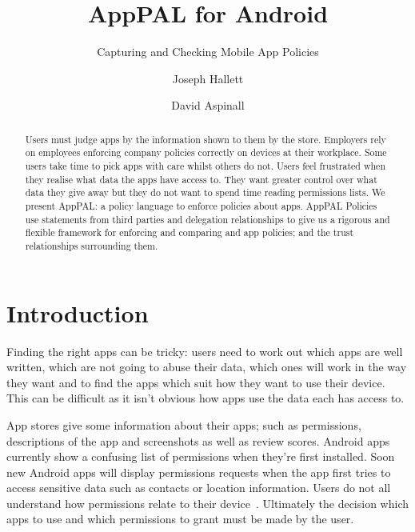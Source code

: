 \documentclass[]{scrartcl}
\title{AppPAL for Android}
\subtitle{Capturing and Checking Mobile App Policies}
\author{Joseph Hallett \and David Aspinall }
\newcommand{\comment}[1]{}%
\begin{document}
\maketitle{}

\begin{abstract}
  Users must judge apps by the information shown to them by the store.
  Employers rely on employees enforcing company policies correctly on devices at their workplace.
  Some users take time to pick apps with care whilst others do not.
  Users feel frustrated when they realise what data the apps have access to.
  They want greater control over what data they give away but they do not want to spend time reading permissions lists.
  We present AppPAL: a policy language to enforce policies about apps.
  AppPAL Policies use statements from third parties and delegation relationships to
  give us a rigorous and flexible framework for enforcing and comparing and app policies; and the trust relationships surrounding them.
\end{abstract}

\section{Introduction \comment{1 page}}
\label{sec:introduction}

Finding the right apps can be tricky:
  users need to work out which apps are well written, which are not going to abuse their data, which ones will work in the way they want
  and to find the apps which suit how they want to use their device.
This can be difficult as it isn't obvious how apps use the data each has access to.

App stores give some information about their apps; such as permissions, descriptions of the app and screenshots as well as review scores.
Android apps currently show a confusing list of permissions when they're first installed.
Soon new Android apps will display permissions requests when the app first tries to access sensitive data such as contacts or location information.
Users do not all understand how permissions relate to their device~\citep{Felt:2012hm,Thompson:2013eb}.
Ultimately the decision which apps to use and which permissions to grant must be made by the user.
\end{document}
